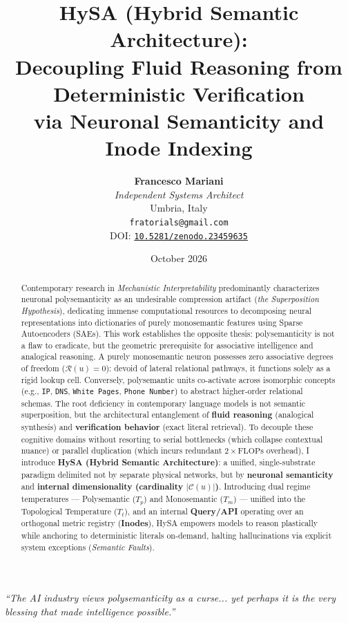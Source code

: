 \documentclass[11pt,a4paper]{article}
\title{\vspace{-0.8cm}\textbf{\LARGE HySA (Hybrid Semantic Architecture): \\ \Large Decoupling Fluid Reasoning from Deterministic Verification \\ via Neuronal Semanticity and Inode Indexing}}
\author{
    \textbf{Francesco Mariani} \\
    \textit{Independent Systems Architect} \\
    Umbria, Italy \\
    \texttt{fratorials@gmail.com} \\
    {\footnotesize DOI: \href{https://doi.org/10.5281/zenodo.23459635}{\texttt{10.5281/zenodo.23459635}}} \quad {\footnotesize ORCID: \href{https://orcid.org/0009-0008-1319-3573}{\texttt{0009-0008-1319-3573}}}
}
\date{October 2026}
\theoremstyle{definition}
\begin{document}
\maketitle

\begin{center}
    \vspace{-0.35cm}
    \textit{``The AI industry views polysemanticity as a curse... yet perhaps it is the very blessing that made intelligence possible.''}
    \vspace{0.35cm}
\end{center}

\begin{abstract}
\noindent Contemporary research in \textit{Mechanistic Interpretability} predominantly characterizes neuronal polysemanticity as an undesirable compression artifact (\textit{the Superposition Hypothesis}), dedicating immense computational resources to decomposing neural representations into dictionaries of purely monosemantic features using Sparse Autoencoders (SAEs). This work establishes the opposite thesis: polysemanticity is not a flaw to eradicate, but the geometric prerequisite for associative intelligence and analogical reasoning. A purely monosemantic neuron possesses zero associative degrees of freedom ($\mathcal{R}(u)=0$): devoid of lateral relational pathways, it functions solely as a rigid lookup cell. Conversely, polysemantic units co-activate across isomorphic concepts (e.g., \texttt{IP}, \texttt{DNS}, \texttt{White Pages}, \texttt{Phone Number}) to abstract higher-order relational schemas. The root deficiency in contemporary language models is not semantic superposition, but the architectural entanglement of \textbf{fluid reasoning} (analogical synthesis) and \textbf{verification behavior} (exact literal retrieval). To decouple these cognitive domains without resorting to serial bottlenecks (which collapse contextual nuance) or parallel duplication (which incurs redundant $2\times\mathrm{FLOPs}$ overhead), I introduce \textbf{HySA (Hybrid Semantic Architecture)}: a unified, single-substrate paradigm delimited not by separate physical networks, but by \textbf{neuronal semanticity} and \textbf{internal dimensionality (cardinality $|\mathcal{C}(u)|$)}. Introducing dual regime temperatures — Polysemantic ($T_p$) and Monosemantic ($T_m$) — unified into the Topological Temperature ($T_t$), and an internal \textbf{Query/API} operating over an orthogonal metric registry (\textbf{Inodes}), HySA empowers models to reason plastically while anchoring to deterministic literals on-demand, halting hallucinations via explicit system exceptions (\textit{Semantic Faults}).
\vspace{0.35cm}
\end{abstract}
\end{document}
